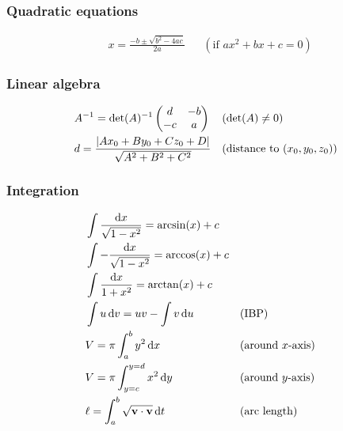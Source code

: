 \begin{multicols}{2}
\subsubsection*{Quadratic equations}
\label{sec:quadratic-equations}

\begin{align*}
    &x = \frac{-b \pm \sqrt{b^2 - 4ac}}{2a} && (\textrm{if } ax^2 + bx + c = 0)
\end{align*}

\subsubsection*{Linear algebra}
\label{sec:linear-algebra}

\begin{align*}
    &A^{-1} = \det(A)^{-1} \begin{pmatrix} d & -b \\ -c & a \end{pmatrix} && (\det(A) \neq 0) \\
    &d = \frac{\left|{Ax_0 + By_0 + Cz_0 + D}\right|}{\sqrt{A^2 + B^2 + C^2}} && (\textrm{distance to } (x_0, y_0, z_0))
\end{align*}

\subsubsection*{Integration}
\label{sec:integration}

\begin{align*}
    &\int \frac{\dif x}{\sqrt{1 - x^2}} = \arcsin(x) + c \\
    &\int -\frac{\dif x}{\sqrt{1 - x^2}} = \arccos(x) + c \\
    &\int \frac{\dif x}{1 + x^2} = \arctan(x) + c \\
    &\int u \dif v = uv - \int v \dif u && (\textrm{IBP}) \\
    &V = \pi\int_a^b y^2 \dif x && (\textrm{around } x{\textrm{-axis}}) \\
    &V = \pi\int_{y = c}^{y = d} x^2 \dif y && (\textrm{around } y{\textrm{-axis}}) \\
    &\ell = \int_a^b\sqrt{\vec{v} \cdot \vec{v}} \dif t && (\textrm{arc length})
\end{align*}

\end{multicols}
